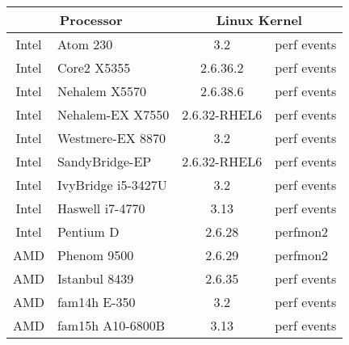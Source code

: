 \begin{tabular}{|c@{ }l|c@{ }l|}

\hline
\multicolumn{2}{|c|}{Processor} &
\multicolumn{2}{|c|}{Linux Kernel} \\
\hline
\hline
Intel  & Atom 230         & 3.2 & perf events \\  %
\hline
Intel  & Core2 X5355      & 2.6.36.2 & perf events \\  %
\hline
Intel  & Nehalem X5570    & 2.6.38.6 & perf events \\  %
\hline
Intel  & Nehalem-EX X7550 & 2.6.32-RHEL6 & perf events \\  %
\hline
Intel  & Westmere-EX 8870 & 3.2 & perf events \\     %
\hline
Intel  & SandyBridge-EP   & 2.6.32-RHEL6 & perf events \\  %
\hline
Intel  & IvyBridge i5-3427U & 3.2  & perf events \\  %
\hline
Intel  & Haswell i7-4770  & 3.13   & perf events \\ %
\hline
Intel  & Pentium D        & 2.6.28 & perfmon2    \\  %
\hline
AMD    & Phenom 9500      & 2.6.29 & perfmon2    \\  %
\hline
AMD    & Istanbul 8439    & 2.6.35 & perf events \\  %
\hline
AMD    & fam14h  E-350    & 3.2    & perf events \\  %
\hline
AMD    & fam15h A10-6800B & 3.13   & perf events \\  %
\hline
\end{tabular}

